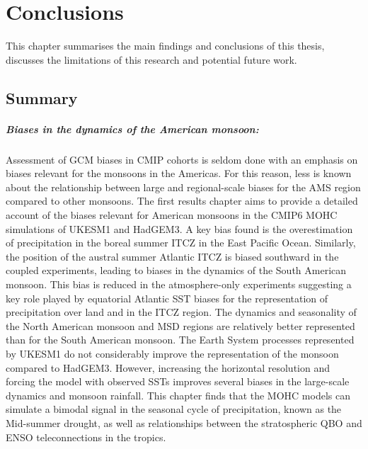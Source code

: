 

\chapter{\label{ch:8-conclusions}Conclusions} 

This chapter summarises the main findings and conclusions of this thesis, discusses the limitations of this research and potential future work.

\section{Summary}

\paragraph{Biases in the dynamics of the American monsoon:}
Assessment of GCM biases in CMIP cohorts is seldom done with an emphasis on biases relevant for the monsoons in the Americas. 
For this reason, less is known about the relationship between large and regional-scale biases for the AMS region compared to other monsoons. 
The first results chapter aims to provide a detailed account of the biases relevant for American monsoons in the CMIP6 MOHC simulations of UKESM1 and HadGEM3. 
A key bias found is the overestimation of precipitation in the boreal summer ITCZ in the East Pacific Ocean. 
Similarly, the position of the austral summer Atlantic ITCZ is biased southward in the coupled experiments, leading to biases in the dynamics of the South American monsoon. 
This bias is reduced in the atmosphere-only experiments suggesting a key role played by equatorial Atlantic SST biases for the representation of precipitation over land and in the ITCZ region.
The dynamics and seasonality of the North American monsoon and MSD regions are relatively better represented than for the South American monsoon.
The Earth System processes represented by UKESM1 do not considerably improve the representation of the monsoon compared to HadGEM3. 
However, increasing the horizontal resolution and forcing the model with observed SSTs improves several biases in the large-scale dynamics and monsoon rainfall. 
This chapter finds that the MOHC models can simulate a bimodal signal in the seasonal cycle of precipitation, known as the Mid-summer drought, as well as relationships between the stratospheric QBO and ENSO teleconnections in the tropics. 

